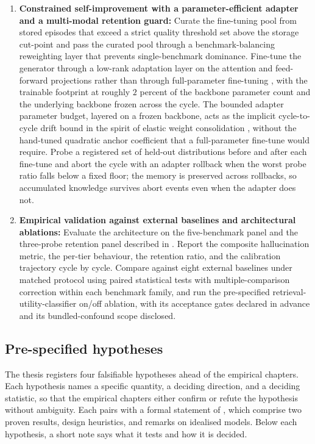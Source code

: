 \begin{enumerate}
\item \textbf{Constrained self-improvement with a parameter-efficient adapter and a multi-modal retention guard:} Curate the fine-tuning pool from stored episodes that exceed a strict quality threshold set above the storage cut-point and pass the curated pool through a benchmark-balancing reweighting layer that prevents single-benchmark dominance. Fine-tune the generator through a low-rank adaptation layer on the attention and feed-forward projections rather than through full-parameter fine-tuning \cite{hu2022lora}, with the trainable footprint at roughly $2$ percent of the backbone parameter count and the underlying backbone frozen across the cycle. The bounded adapter parameter budget, layered on a frozen backbone, acts as the implicit cycle-to-cycle drift bound in the spirit of elastic weight consolidation \cite{doi:10.1073/pnas.1611835114}, without the hand-tuned quadratic anchor coefficient that a full-parameter fine-tune would require. Probe a registered set of held-out distributions before and after each fine-tune and abort the cycle with an adapter rollback when the worst probe ratio falls below a fixed floor; the memory is preserved across rollbacks, so accumulated knowledge survives abort events even when the adapter does not.

\item \textbf{Empirical validation against external baselines and architectural ablations:} Evaluate the architecture on the five-benchmark panel and the three-probe retention panel described in . Report the composite hallucination metric, the per-tier behaviour, the retention ratio, and the calibration trajectory cycle by cycle. Compare against eight external baselines under matched protocol using paired statistical tests with multiple-comparison correction within each benchmark family, and run the pre-specified retrieval-utility-classifier on/off ablation, with its acceptance gates declared in advance and its bundled-confound scope disclosed.
\end{enumerate}

\subsection{Pre-specified hypotheses}
\label{sec:hypotheses}

The thesis registers four falsifiable hypotheses ahead of the empirical chapters. Each hypothesis names a specific quantity, a deciding direction, and a deciding statistic, so that the empirical chapters either confirm or refute the hypothesis without ambiguity. Each pairs with a formal statement of , which comprise two proven results, design heuristics, and remarks on idealised models. Below each hypothesis, a short note says what it tests and how it is decided.


